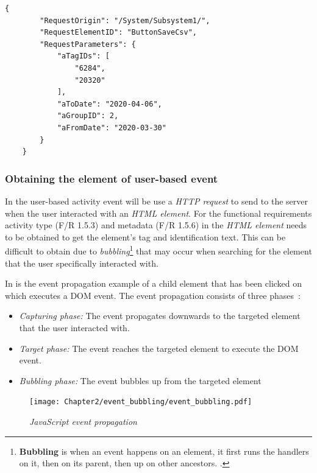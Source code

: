 \begin{lstlisting}[style=json, caption={\textit{Metadata JSON}}, label={fig:ch3_MetadataJson}] 
	{
		"RequestOrigin": "/System/Subsystem1/",
		"RequestElementID": "ButtonSaveCsv",
		"RequestParameters": {
			"aTagIDs": [
				"6284",
				"20320"
			],
			"aToDate": "2020-04-06",
			"aGroupID": 2,
			"aFromDate": "2020-03-30"
		}
	}
\end{lstlisting}

\subsubsection{Obtaining the element of user-based event}\label{sec:ch2_ElementObtaining}
In  the user-based activity event will be use a \textit{HTTP request} to send to the server when the user interacted with an \textit{HTML element}. For the functional requirements activity type (F/R 1.5.3) and metadata (F/R 1.5.6) in  the \textit{HTML element} needs to be obtained to get the element's tag and identification text. This can be difficult to obtain due to \textit{bubbling}\footnote{\textbf{Bubbling} is when an event happens on an element, it first runs the handlers on it, then on its parent, then up on other ancestors. \cite{EventBubbling}.} that may occur when searching for the element that the user specifically interacted with.\par In  is the event propagation example of a child element that has been clicked on which executes a DOM event. The event propagation consists of three phases~\cite{EventBubbling}:

\begin{itemize}
	\item \textit{Capturing phase:} The event propagates downwards to the targeted element that the user interacted with.
	\item \textit{Target phase:} The event reaches the targeted element to execute the DOM event.
	\item \textit{Bubbling phase:} The event bubbles up from the targeted element
\end{itemize}

\begin{figure}[!htb] %
	\centering %
	\texttt{[image: Chapter2/event\_bubbling/event\_bubbling.pdf]}
	\caption[JavaScript event propagation]
	{\textit{JavaScript event propagation~\cite{EventBubbling}}}\label{fig:ch2_event_bubbling}
\end{figure}


